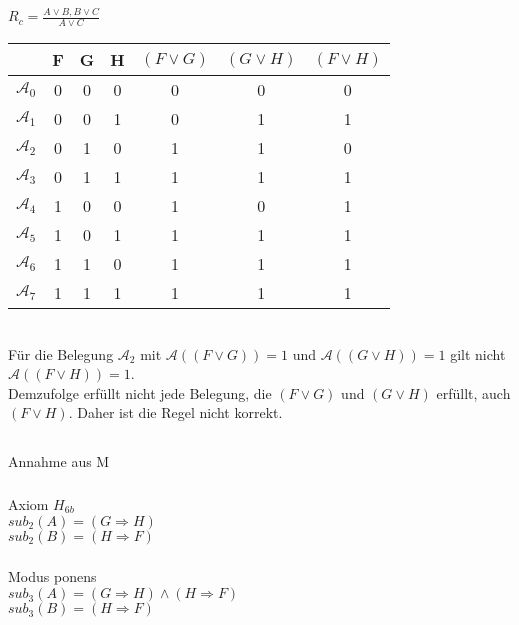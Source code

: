 \documentclass[10pt,a4paper,oneside,ngerman,numbers=noenddot]{scrartcl}
\def\thesubsubsection{(\alph{subsubsection})}
\begin{document}
\subsubsection{} %
$R_{c} = \frac{A \vee B, B \vee C}{A \vee C}$\\
\begin{tabular}{c|ccc|ccc}
 & F & G & H & $(F \vee G)$ & $(G \vee H)$ & $(F \vee H)$ \\
 \hline
$\mathcal{A}_{0}$ & 0 & 0 & 0 & 0 & 0 & 0\\
$\mathcal{A}_{1}$ & 0 & 0 & 1 & 0 & 1 & 1\\
$\mathcal{A}_{2}$ & 0 & 1 & 0 & 1 & 1 & 0\\
$\mathcal{A}_{3}$ & 0 & 1 & 1 & 1 & 1 & 1\\
$\mathcal{A}_{4}$ & 1 & 0 & 0 & 1 & 0 & 1\\
$\mathcal{A}_{5}$ & 1 & 0 & 1 & 1 & 1 & 1\\
$\mathcal{A}_{6}$ & 1 & 1 & 0 & 1 & 1 & 1\\
$\mathcal{A}_{7}$ & 1 & 1 & 1 & 1 & 1 & 1\\
\end{tabular}\\
Für die Belegung $\mathcal{A}_{2}$ mit $\mathcal{A}((F \vee G)) = 1$ und $\mathcal{A}((G \vee H)) = 1$ gilt nicht $\mathcal{A}((F \vee H)) = 1$.\\
Demzufolge erfüllt nicht jede Belegung, die $(F \vee G)$ und $(G \vee H)$ erfüllt, auch $(F \vee H)$. Daher ist die Regel nicht korrekt.
\subsection{} %
\def\thesubsubsection{(\arabic{subsubsection})}
\subsubsection{} %
Annahme aus M
\subsubsection{} %
Axiom $H_{6b}$ \\
$sub_{2}(A) = (G \Rightarrow H)$ \\
$sub_{2}(B) = (H \Rightarrow F)$
\subsubsection{} %
Modus ponens\\
$sub_{3}(A) = (G \Rightarrow H) \wedge (H \Rightarrow F)$ \\
$sub_{3}(B) = (H \Rightarrow F)$
\end{document}
